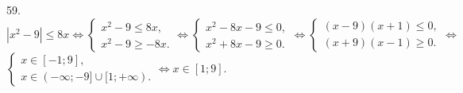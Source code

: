 59. $|x^2-9|\leqslant8x\Leftrightarrow \begin{cases} x^2-9\leqslant8x,\\ x^2-9\geqslant-8x.\end{cases}\Leftrightarrow \begin{cases} x^2-8x-9\leqslant0,\\ x^2+8x-9\geqslant0.\end{cases}\Leftrightarrow \begin{cases} (x-9)(x+1)\leqslant0,\\ (x+9)(x-1)\geqslant0.\end{cases}
\Leftrightarrow$\\$ \begin{cases} x\in[-1;9],\\ x\in(-\infty;-9]\cup[1;+\infty).\end{cases}\Leftrightarrow x\in[1;9].$\\
